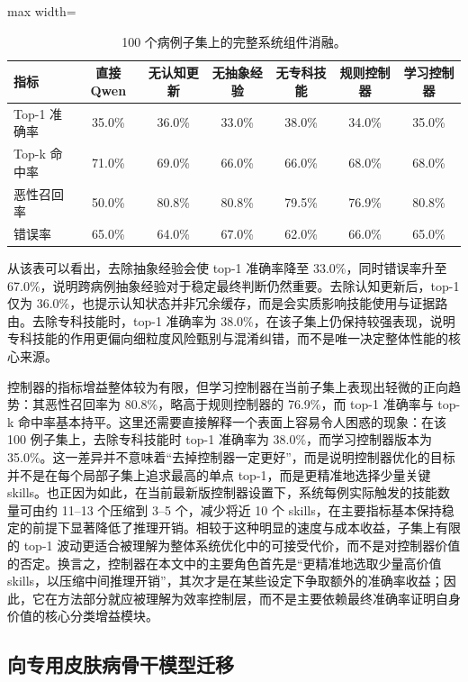 \documentclass{article}
\begin{document}
\begin{table}[t]
\centering
\caption{100 个病例子集上的完整系统组件消融。}
\label{tab:ablation_full}
\begin{adjustbox}{max width=\columnwidth}
\scriptsize
\begin{tabular}{lcccccc}
\toprule
指标 & 直接 Qwen & 无认知更新 & 无抽象经验 & 无专科技能 & 规则控制器 & 学习控制器 \\
\midrule
Top-1 准确率 & 35.0\% & 36.0\% & 33.0\% & 38.0\% & 34.0\% & 35.0\% \\
Top-k 命中率 & 71.0\% & 69.0\% & 66.0\% & 66.0\% & 68.0\% & 68.0\% \\
恶性召回率 & 50.0\% & 80.8\% & 80.8\% & 79.5\% & 76.9\% & 80.8\% \\
错误率 & 65.0\% & 64.0\% & 67.0\% & 62.0\% & 66.0\% & 65.0\% \\
\bottomrule
\end{tabular}
\end{adjustbox}
\end{table}

从该表可以看出，去除抽象经验会使 top-1 准确率降至 33.0\%，同时错误率升至 67.0\%，说明跨病例抽象经验对于稳定最终判断仍然重要。去除认知更新后，top-1 仅为 36.0\%，也提示认知状态并非冗余缓存，而是会实质影响技能使用与证据路由。去除专科技能时，top-1 准确率为 38.0\%，在该子集上仍保持较强表现，说明专科技能的作用更偏向细粒度风险甄别与混淆纠错，而不是唯一决定整体性能的核心来源。

控制器的指标增益整体较为有限，但学习控制器在当前子集上表现出轻微的正向趋势：其恶性召回率为 80.8\%，略高于规则控制器的 76.9\%，而 top-1 准确率与 top-k 命中率基本持平。这里还需要直接解释一个表面上容易令人困惑的现象：在该 100 例子集上，去除专科技能时 top-1 准确率为 38.0\%，而学习控制器版本为 35.0\%。这一差异并不意味着“去掉控制器一定更好”，而是说明控制器优化的目标并不是在每个局部子集上追求最高的单点 top-1，而是更精准地选择少量关键 skills。也正因为如此，在当前最新版控制器设置下，系统每例实际触发的技能数量可由约 11--13 个压缩到 3--5 个，减少将近 10 个 skills，在主要指标基本保持稳定的前提下显著降低了推理开销。相较于这种明显的速度与成本收益，子集上有限的 top-1 波动更适合被理解为整体系统优化中的可接受代价，而不是对控制器价值的否定。换言之，控制器在本文中的主要角色首先是“更精准地选取少量高价值 skills，以压缩中间推理开销”，其次才是在某些设定下争取额外的准确率收益；因此，它在方法部分就应被理解为效率控制层，而不是主要依赖最终准确率证明自身价值的核心分类增益模块。

\subsection{向专用皮肤病骨干模型迁移}
\end{document}

